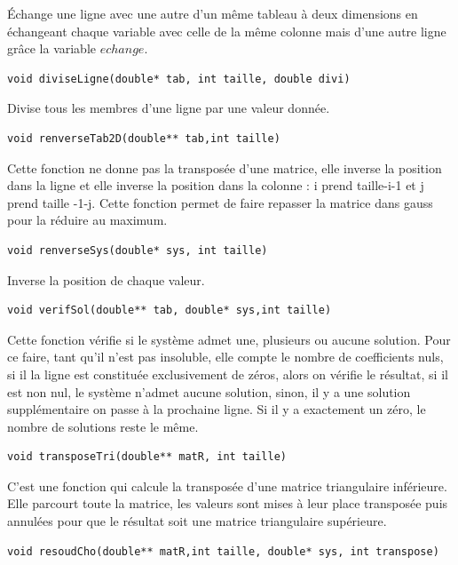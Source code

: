 \documentclass{article}
\begin{document}
Échange une ligne avec une autre d'un même tableau à deux dimensions en échangeant chaque variable avec celle de la même colonne mais d'une autre ligne grâce la variable $echange$.
\\
\begin{verbatim}
void diviseLigne(double* tab, int taille, double divi)
\end{verbatim}



Divise tous les membres d'une ligne par une valeur donnée.
\\
\begin{verbatim}
void renverseTab2D(double** tab,int taille)
\end{verbatim}


Cette fonction ne donne pas la transposée d'une matrice, elle inverse la position dans la ligne et elle inverse la position dans la colonne : i prend taille-i-1 et j prend taille -1-j.
Cette fonction permet de faire repasser la matrice dans gauss pour la réduire au maximum.
\\
\begin{verbatim}
void renverseSys(double* sys, int taille)
\end{verbatim}



Inverse la position de chaque valeur.
\\
\begin{verbatim}
void verifSol(double** tab, double* sys,int taille)
\end{verbatim}



Cette fonction vérifie si le système admet une, plusieurs ou aucune solution. Pour ce faire, tant qu'il n'est pas insoluble, elle compte le nombre de coefficients nuls, si il la ligne est constituée exclusivement de zéros, alors on vérifie le résultat, si il est non nul, le système n'admet aucune solution, sinon, il y a une solution supplémentaire on passe à la prochaine ligne. Si il y a exactement un zéro, le nombre de solutions reste le même.
\\
\begin{verbatim}
void transposeTri(double** matR, int taille)
\end{verbatim}



C'est une fonction qui calcule la transposée d'une matrice triangulaire inférieure. Elle parcourt toute la matrice, les valeurs sont mises à leur place transposée puis annulées pour que le résultat soit une matrice triangulaire supérieure.
\\
\begin{verbatim}
void resoudCho(double** matR,int taille, double* sys, int transpose)
\end{verbatim}
\end{document}
